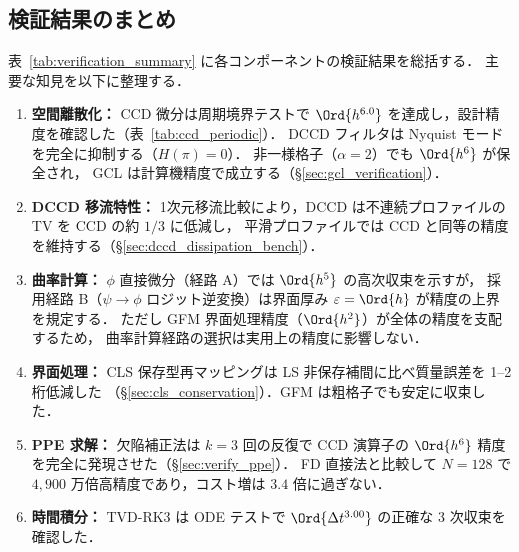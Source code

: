 %
\subsection{検証結果のまとめ}
\label{sec:verify_summary}

表~\ref{tab:verification_summary} に各コンポーネントの検証結果を総括する．
主要な知見を以下に整理する．

\begin{enumerate}
  \item \textbf{空間離散化：}
        CCD 微分は周期境界テストで $\Ord{h^{6.0}}$ を達成し，設計精度を確認した（表~\ref{tab:ccd_periodic}）．
        DCCD フィルタは Nyquist モードを完全に抑制する（$H(\pi)=0$）．
        非一様格子（$\alpha=2$）でも $\Ord{h^6}$ が保全され，
        GCL は計算機精度で成立する（§\ref{sec:gcl_verification}）．
  \item \textbf{DCCD 移流特性：}
        1次元移流比較により，DCCD は不連続プロファイルの TV を CCD の約 $1/3$ に低減し，
        平滑プロファイルでは CCD と同等の精度を維持する（§\ref{sec:dccd_dissipation_bench}）．
  \item \textbf{曲率計算：}
        $\phi$ 直接微分（経路 A）では $\Ord{h^5}$ の高次収束を示すが，
        採用経路 B（$\psi \to \phi$ ロジット逆変換）は界面厚み $\varepsilon = \Ord{h}$ が精度の上界を規定する．
        ただし GFM 界面処理精度（$\Ord{h^2}$）が全体の精度を支配するため，
        曲率計算経路の選択は実用上の精度に影響しない．
  \item \textbf{界面処理：}
        CLS 保存型再マッピングは LS 非保存補間に比べ質量誤差を 1--2 桁低減した
        （§\ref{sec:cls_conservation}）．GFM は粗格子でも安定に収束した．
  \item \textbf{PPE 求解：}
        欠陥補正法は $k=3$ 回の反復で CCD 演算子の $\Ord{h^6}$ 精度を完全に発現させた（§\ref{sec:verify_ppe}）．
        FD 直接法と比較して $N=128$ で $4{,}900$ 万倍高精度であり，コスト増は $3.4$ 倍に過ぎない．
  \item \textbf{時間積分：}
        TVD-RK3 は ODE テストで $\Ord{\Delta t^{3.00}}$ の正確な 3 次収束を確認した．
\end{enumerate}

